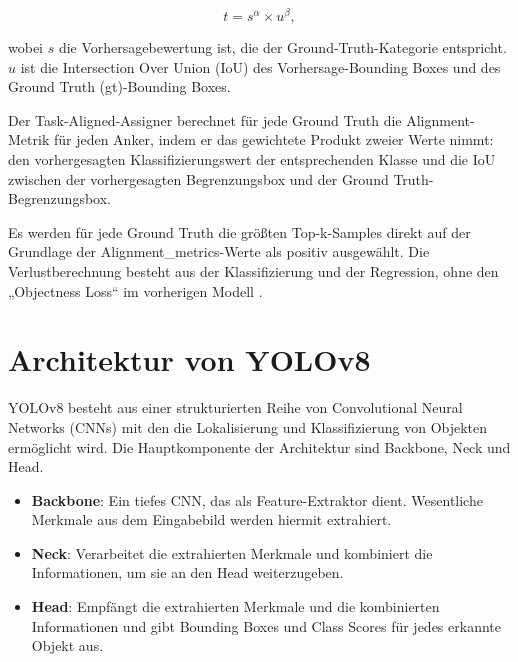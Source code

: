 \documentclass[a4paper,12pt]{article}
\begin{document}
\[
t = s^\alpha \times u^\beta,
\]

\noindent wobei $s$ die Vorhersagebewertung ist, die der Ground-Truth-Kategorie entspricht. $u$ ist die Intersection Over Union (IoU) des Vorhersage-Bounding Boxes und des Ground Truth (gt)-Bounding Boxes.

\noindent Der Task-Aligned-Assigner berechnet für jede Ground Truth die Alignment-Metrik für jeden Anker, indem er das gewichtete Produkt zweier Werte nimmt: den vorhergesagten Klassifizierungswert der entsprechenden Klasse und die IoU zwischen der vorhergesagten Begrenzungsbox und der Ground Truth-Begrenzungsbox.

\noindent Es werden für jede Ground Truth die größten Top-k-Samples direkt auf der Grundlage der Alignment\_metrics-Werte als positiv ausgewählt. Die Verlustberechnung besteht aus der Klassifizierung und der Regression, ohne den „Objectness Loss“ im vorherigen Modell \cite{openmmlab2023dive}.


\section{Architektur von YOLOv8}
YOLOv8 besteht aus einer strukturierten Reihe von Convolutional Neural Networks (CNNs) mit den die Lokalisierung und Klassifizierung von Objekten ermöglicht wird. Die Hauptkomponente der Architektur sind Backbone, Neck und Head.


\begin{itemize}
    \item \textbf{Backbone}: Ein tiefes CNN, das als Feature-Extraktor dient. Wesentliche Merkmale aus dem Eingabebild werden hiermit extrahiert.
    \item \textbf{Neck}: Verarbeitet die extrahierten Merkmale und kombiniert die Informationen, um sie an den Head weiterzugeben.
    \item \textbf{Head}: Empfängt die extrahierten Merkmale und die kombinierten Informationen und gibt Bounding Boxes und Class Scores für jedes erkannte Objekt aus.
\end{itemize}
\end{document}
